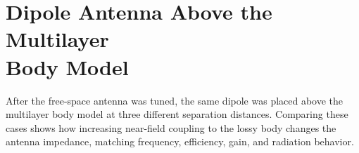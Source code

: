 \section{Dipole Antenna Above the Multilayer \\Body Model}

After the free-space antenna was tuned, the same dipole was placed above the multilayer body model at three different separation distances. Comparing these cases shows how increasing near-field coupling to the lossy body changes the antenna impedance, matching frequency, efficiency, gain, and radiation behavior.




